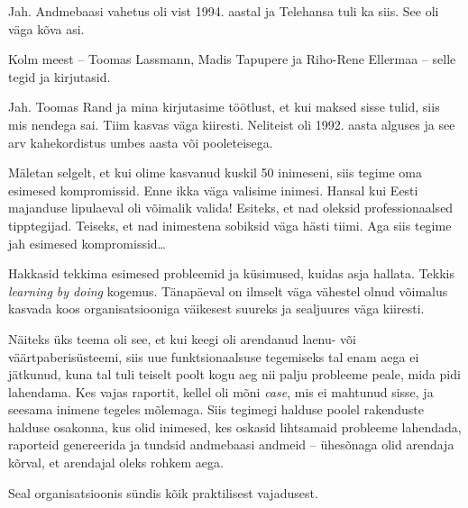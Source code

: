 Jah. Andmebaasi vahetus oli vist 1994. aastal ja Telehansa tuli ka siis. See
oli väga kõva asi.


Kolm meest -- Toomas Lassmann, Madis Tapupere ja Riho-Rene 
Ellermaa -- selle tegid ja kirjutasid. 


Jah. Toomas Rand ja mina kirjutasime töötlust, et kui 
maksed sisse tulid, siis mis nendega sai. Tiim kasvas väga kiiresti. Neliteist oli 
1992. aasta alguses ja see arv kahekordistus umbes 
aasta või pooleteisega. 


Mäletan selgelt, et kui olime kasvanud kuskil 50 inimeseni, siis tegime 
oma esimesed kompromissid. Enne ikka väga valisime inimesi. Hansal kui Eesti majanduse lipulaeval oli võimalik valida! 
Esiteks, et nad oleksid professionaalsed tipptegijad. Teiseks, et nad inimestena sobiksid väga 
hästi tiimi. Aga siis tegime jah esimesed kompromissid\ldots

Hakkasid tekkima esimesed probleemid ja küsimused, kuidas asja hallata. Tekkis \emph{learning by doing} kogemus. Tänapäeval on ilmselt väga vähestel olnud 
võimalus kasvada koos organisatsiooniga väikesest suureks ja sealjuures väga kiiresti. 

Näiteks üks teema oli see, et kui keegi oli arendanud 
laenu- või väärtpaberisüsteemi, siis uue 
funktsionaalsuse tegemiseks tal enam aega ei jätkunud, kuna tal tuli teiselt poolt kogu aeg nii palju 
probleeme peale, mida pidi lahendama. Kes vajas 
raportit, kellel oli mõni \emph{case}, mis ei mahtunud sisse, 
ja seesama inimene tegeles mõlemaga. Siis tegimegi halduse poolel rakenduste halduse osakonna, kus olid 
inimesed, kes oskasid lihtsamaid probleeme lahendada, raporteid genereerida 
ja tundsid andmebaasi andmeid -- ühesõnaga olid arendaja 
kõrval, et arendajal oleks rohkem aega. 


Seal organisatsioonis sündis kõik praktilisest vajadusest. 

